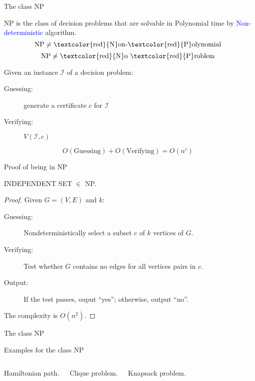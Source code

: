 \begin{frame}{The class NP}
  \begin{definition}
    NP is the class of decision problems that are solvable in Polynomial time by \textcolor{blue}{Non-deterministic} algorithm.
    \[
      \text{NP} \neq \textrm{\textcolor{red}{N}on-\textcolor{red}{P}olynomial}
    \]
    \[
      \text{NP} \neq \textrm{\textcolor{red}{N}o \textcolor{red}{P}roblem}
    \]
  \end{definition}

  \pause
  \begin{definition}
    Given an instance $\mathcal{I}$ of a decision problem:
    \begin{description}
      \item[Guessing:] generate a certificate $c$ for $\mathcal{I}$
      \item[Verifying:] $V(\mathcal{I},c)$
    \end{description}

    \[
     O(\text{Guessing}) + O(\text{Verifying}) = O(n^{c})
    \]
  \end{definition}

\end{frame}
\begin{frame}{Proof of being in NP}
  \begin{theorem}{}
    INDEPENDENT SET $\in$ NP.
  \end{theorem}

  \begin{proof}
    Given $G = (V,E)$ and $k$:
    \begin{description}
      \item[Guessing:] Nondeterministically select a subset $c$ of $k$ vertices of $G$. 
      \item[Verifying:] Test whether $G$ contains no edges for all vertices pairs in $c$.
      \item[Output:] If the test passes, ouput ``yes''; otherwise, output ``no''.
    \end{description}
    The complexity is $O(n^{2})$.
  \end{proof}
\end{frame}
\begin{frame}{The class NP}
  \begin{exampleblock}{Examples for the class NP}
    \begin{columns}[t]
	\begin{center}
	  Hamiltonian path.
	\end{center}
	\begin{center}
	  Clique problem.
	\end{center}
	\begin{center}
	  Knapsack problem.
	\end{center}
    \end{columns}
  \end{exampleblock}
\end{frame}
